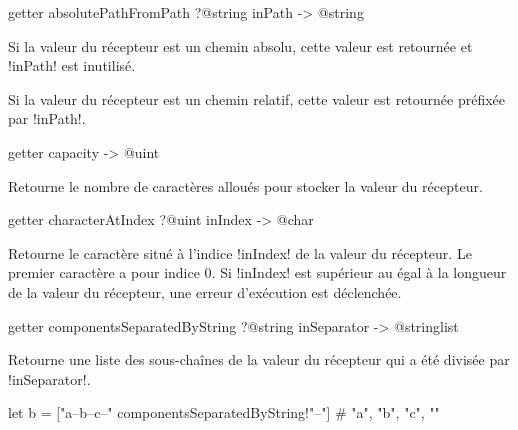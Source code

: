 
\begin{galgasbox}
getter absolutePathFromPath ?@string inPath -> @string
\end{galgasbox}

Si la valeur du récepteur est un chemin absolu, cette valeur est retournée et \ggs!inPath! est inutilisé.

Si la valeur du récepteur est un chemin relatif, cette valeur est retournée préfixée par \ggs!inPath!.







\begin{galgasbox}
getter capacity -> @uint
\end{galgasbox}

Retourne le nombre de caractères alloués pour stocker la valeur du récepteur. 








\begin{galgasbox}
getter characterAtIndex ?@uint inIndex -> @char
\end{galgasbox}

Retourne le caractère situé à l'indice \ggs!inIndex! de la valeur du récepteur. Le premier caractère a pour indice $0$. Si \ggs!inIndex! est supérieur au égal à la longueur de la valeur du récepteur, une erreur d'exécution est déclenchée.












\begin{galgasbox}
getter componentsSeparatedByString  ?@string inSeparator -> @stringlist
\end{galgasbox}
Retourne une liste des sous-chaînes de la valeur du récepteur qui a été divisée par \ggs!inSeparator!.

\begin{galgas}
let b = ["a--b--c--" componentsSeparatedByString!"--"] # "a", "b", "c", ""
\end{galgas}












